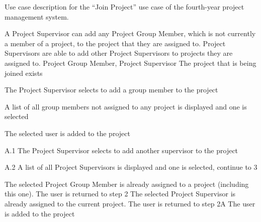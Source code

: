 \begin{table}
  \centering
  \caption{Use case description for the ``Join Project'' use case of the fourth-year project management system.}
  \label{tbl:use-case-join-project}

  \begin{usecase}
    A Project Supervisor can add any Project Group Member, which is not currently a member of a project, to the project that they are assigned to. Project Supervisors are able to add other Project Supervisors to projects they are assigned to.
    Project Group Member, Project Supervisor
    The project that is being joined exists
    \ucnormal
    \begin{ucenum}
      \item The Project Supervisor selects to add a group member to the project
      \item A list of all group members not assigned to any project is displayed and one is selected
      \item The selected user is added to the project
    \end{ucenum}
    \begin{ucenum}
      \item [A.1] The Project Supervisor selects to add another supervisor to the project
      \item [A.2] A list of all Project Supervisors is displayed and one is selected, continue to 3
    \end{ucenum}
    The selected Project Group Member is already assigned to a project (including this one). The user is returned to step 2
    The selected Project Supervisor is already assigned to the current project. The user is returned to step 2A
    The user is added to the project
  \end{usecase}
\end{table}


